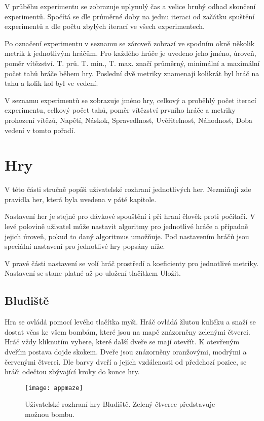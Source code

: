 V průběhu experimentu se zobrazuje uplynulý čas a velice hrubý odhad skončení experimentů. Spočítá se dle průměrné doby na jednu iteraci od začátku spuštění experimentů a dle počtu zbylých iterací ve všech experimentech.

Po označení experimentu v seznamu se zároveň zobrazí ve spodním okně několik metrik k jednotlivým hráčům. Pro každého hráče je uvedeno jeho jméno, úroveň, poměr vítězství. T. prů. T. min., T. max. značí průměrný, minimální a maximální počet tahů hráče během hry. Poslední dvě metriky znamenají kolikrát byl hráč na tahu a kolik kol byl ve vedení.

V seznamu experimentů se zobrazuje jméno hry, celkový a proběhlý počet iterací experimentu, celkový počet tahů, poměr vítězství prvního hráče a metriky prohození vítězů, Napětí, Náskok, Spravedlnost, Uvěřitelnost, Náhodnost, Doba vedení v tomto pořadí.

\section{Hry}

V této části stručně popíši uživatelské rozhraní jednotlivých her. Nezmiňuji zde pravidla her, která byla uvedena v páté kapitole.

Nastavení her je stejné pro dávkové spouštění i při hraní člověk proti počítači. V levé polovině uživatel může nastavit algoritmy pro jednotlivé hráče a případně jejich úroveň, pokud to daný algoritmus umožňuje. Pod nastavením hráčů jsou speciální nastavení pro jednotlivé hry popsány níže.

V pravé části nastavení se volí hráč prostředí a koeficienty pro jednotlivé metriky. Nastavení se stane platné až po uložení tlačítkem Uložit.

\subsection{Bludiště}

Hra se ovládá pomocí levého tlačítka myši. Hráč ovládá žlutou kuličku a snaží se dostat včas ke všem bombám, které jsou na mapě znázorněny zelenými čtverci. Hráč vždy kliknutím vybere, které další dveře se mají otevřít. K otevřeným dveřím postava dojde skokem. Dveře jsou znázorněny oranžovými, modrými a červenými čtverci. Dle barvy dveří a jejich vzdálenosti od předchozí pozice, se hráči odečtou zbývající kroky do konce hry.

\begin{figure}
  \centering
  \texttt{[image: appmaze]}
	\caption{Uživatelské rozhraní hry Bludiště. Zelený čtverec představuje možnou bombu. }
	\label{fig-appmaze}
\end{figure}

